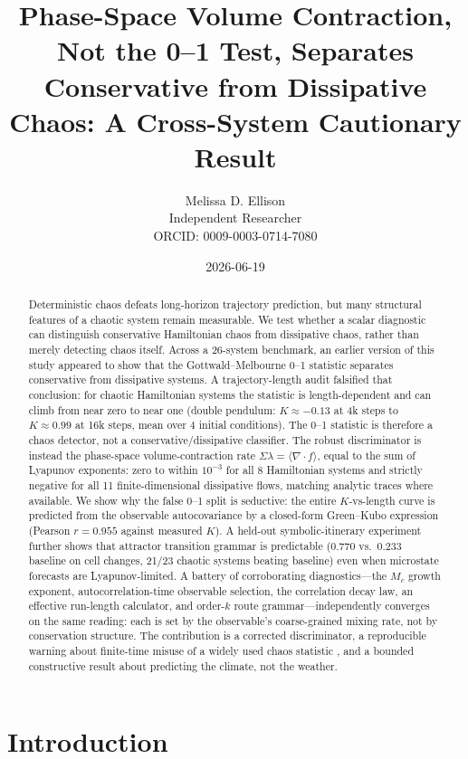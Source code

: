 \documentclass[11pt]{article}
\title{Phase-Space Volume Contraction, Not the 0--1 Test, Separates\\
Conservative from Dissipative Chaos: A Cross-System Cautionary Result}
\author{Melissa D. Ellison\\\small Independent Researcher\\
\small ORCID: 0009-0003-0714-7080}
\date{\small 2026-06-19}
\begin{document}
\maketitle

\begin{abstract}
Deterministic chaos defeats long-horizon trajectory prediction, but many structural
features of a chaotic system remain measurable. We test whether a scalar diagnostic
can distinguish conservative Hamiltonian chaos from dissipative chaos, rather than
merely detecting chaos itself. Across a 26-system benchmark, an earlier version of
this study appeared to show that the Gottwald--Melbourne 0--1 statistic separates
conservative from dissipative systems. A trajectory-length audit falsified that
conclusion: for chaotic Hamiltonian systems the statistic is length-dependent and
can climb from near zero to near one (double pendulum: $K\approx-0.13$ at 4k steps
to $K\approx0.99$ at 16k steps, mean over 4 initial conditions). The 0--1 statistic
is therefore a chaos detector, not a conservative/dissipative classifier. The robust
discriminator is instead the phase-space volume-contraction rate
$\Sigma\lambda=\langle\nabla\!\cdot f\rangle$, equal to the sum of Lyapunov
exponents: zero to within $10^{-3}$ for all 8 Hamiltonian systems and strictly
negative for all 11 finite-dimensional dissipative flows, matching analytic traces
where available. We show why the false 0--1 split is seductive: the entire
$K$-vs-length curve is predicted from the observable autocovariance by a closed-form
Green--Kubo expression (Pearson $r=0.955$ against measured $K$). A held-out
symbolic-itinerary experiment further shows that attractor transition grammar is
predictable ($0.770$ vs.\ $0.233$ baseline on cell changes, 21/23 chaotic systems
beating baseline) even when microstate forecasts are Lyapunov-limited. A battery of
corroborating diagnostics---the $M_c$ growth exponent, autocorrelation-time
observable selection, the correlation decay law, an effective run-length
calculator, and order-$k$ route grammar---independently converges on the same
reading: each is set by the observable's coarse-grained mixing rate, not by
conservation structure. The
contribution is a corrected discriminator, a reproducible warning about finite-time
misuse of a widely used chaos statistic \cite{falconer2007}, and a bounded
constructive result about predicting the climate, not the weather.
\end{abstract}

\section{Introduction}
\end{document}
